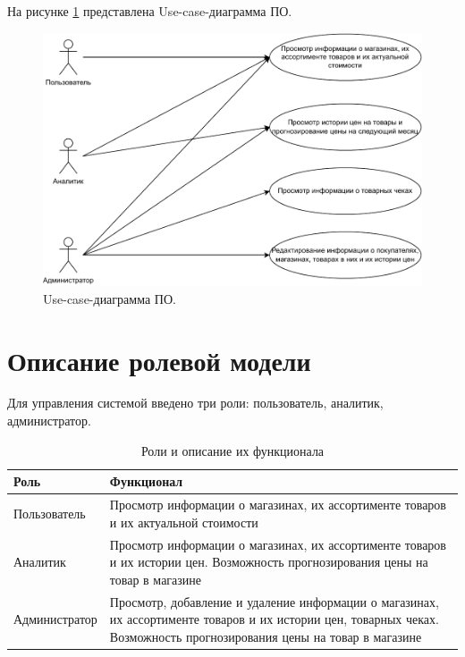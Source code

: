 \documentclass[a4paper,14pt]{extreport}
\begin{document}
На рисунке \ref{use_case} представлена Use-case-диаграмма ПО.

\captionsetup{singlelinecheck = false, justification=centering}
\begin{figure}[H]
	\centering
	\includegraphics[scale=0.8]{use_case.drawio.pdf}
	\caption{Use-case-диаграмма ПО.}
	\label{use_case}
\end{figure}

\section{Описание ролевой модели}

Для управления системой введено три роли: пользователь, аналитик, администратор.

\begin{table}[H]
	\caption{Роли и описание их функционала}
	\begin{center}
		\begin{tabular}{| l | p{12 cm} |} 
			\hline
			
			\textbf{Роль} & \textbf{Функционал} \\  
			
			\hline
			
			Пользователь & Просмотр информации о магазинах, их ассортименте товаров и их актуальной стоимости \\
			
			\hline
			
			Аналитик & Просмотр информации о магазинах, их ассортименте товаров и их истории цен. Возможность прогнозирования цены на товар в магазине \\
			
			\hline
			
			Администратор & Просмотр, добавление и удаление информации о магазинах, их ассортименте товаров и их истории цен, товарных чеках. Возможность прогнозирования цены на товар в магазине \\
			
			\hline
		\end{tabular}
	\end{center}
\end{table}
\end{document}
